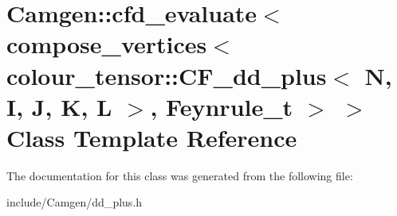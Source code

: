 \hypertarget{a00044}{}\section{Camgen\+:\+:cfd\+\_\+evaluate$<$ compose\+\_\+vertices$<$ colour\+\_\+tensor\+:\+:C\+F\+\_\+dd\+\_\+plus$<$ N, I, J, K, L $>$, Feynrule\+\_\+t $>$ $>$ Class Template Reference}
\label{a00044}


The documentation for this class was generated from the following file\+:\begin{DoxyCompactItemize}
\item 
include/\+Camgen/dd\+\_\+plus.\+h\end{DoxyCompactItemize}
